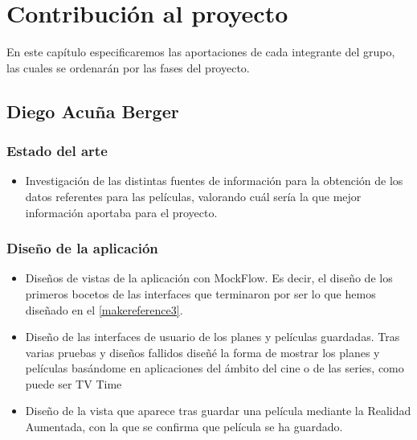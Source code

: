 
\cleardoublepage


\chapter{Contribución al proyecto}
\label{makereference7}
En este capítulo especificaremos las aportaciones de cada integrante del grupo,
 las cuales se ordenarán por las fases del proyecto.

\section{Diego Acuña Berger}
\label{makereference7.1}
    \subsection{Estado del arte}
    \label{makereference7.1.1}
        \begin{itemize}
            \item Investigación de las distintas fuentes de información para la obtención de los datos referentes para las películas, valorando cuál sería la que mejor información aportaba para el proyecto.
        \end{itemize}
    \subsection{Diseño de la aplicación}
    \label{makereference7.1.2}
        \begin{itemize}
            \item Diseños de vistas de la aplicación con MockFlow. Es decir, el diseño de los primeros bocetos de las interfaces que terminaron por ser lo que hemos diseñado en el \autoref{makereference3}.
            \item Diseño de las interfaces de usuario de los planes y películas
            guardadas. Tras varias pruebas y diseños fallidos diseñé la forma de mostrar los planes y películas basándome en aplicaciones del ámbito del cine o de las series, como puede ser TV Time \cite{tvtime}
            \item Diseño de la vista que aparece tras guardar una película mediante la Realidad Aumentada, con la que se confirma que película se ha guardado.
        \end{itemize}

